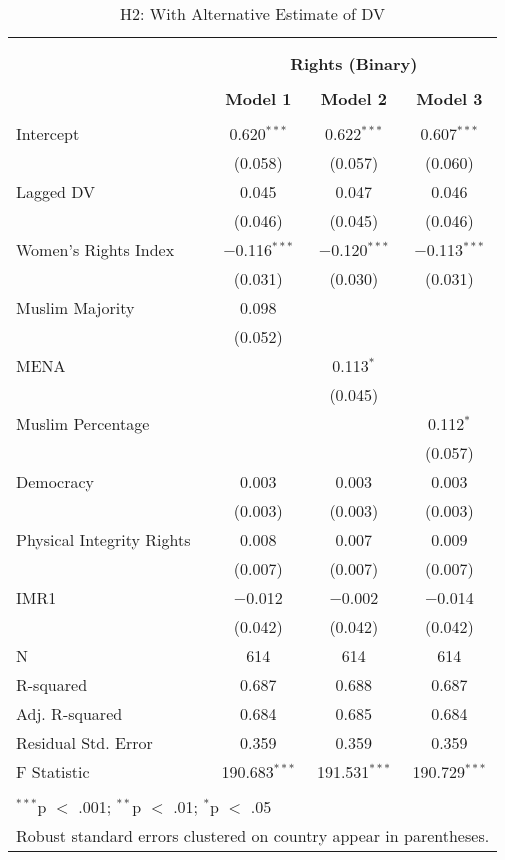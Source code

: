 
\begin{table}[!htbp] \centering 
  \caption{H2: With Alternative Estimate of DV} 
  \label{} 
\begin{tabular}{@{\extracolsep{5pt}}lccc} 
\\[-1.8ex]\hline \\[-1.8ex] 
\\[-1.8ex] & \multicolumn{3}{c}{\textbf{Rights (Binary)}} \\ 
\\[-1.8ex] & \textbf{Model 1} & \textbf{Model 2} & \textbf{Model 3}\\ 
\hline \\[-1.8ex] 
 Intercept & 0.620$^{***}$ & 0.622$^{***}$ & 0.607$^{***}$ \\ 
  & (0.058) & (0.057) & (0.060) \\ 
  Lagged DV & 0.045 & 0.047 & 0.046 \\ 
  & (0.046) & (0.045) & (0.046) \\ 
  Women's Rights Index & $-$0.116$^{***}$ & $-$0.120$^{***}$ & $-$0.113$^{***}$ \\ 
  & (0.031) & (0.030) & (0.031) \\ 
  Muslim Majority & 0.098 &  &  \\ 
  & (0.052) &  &  \\ 
  MENA &  & 0.113$^{*}$ &  \\ 
  &  & (0.045) &  \\ 
  Muslim Percentage &  &  & 0.112$^{*}$ \\ 
  &  &  & (0.057) \\ 
  Democracy & 0.003 & 0.003 & 0.003 \\ 
  & (0.003) & (0.003) & (0.003) \\ 
  Physical Integrity Rights & 0.008 & 0.007 & 0.009 \\ 
  & (0.007) & (0.007) & (0.007) \\ 
  IMR1 & $-$0.012 & $-$0.002 & $-$0.014 \\ 
  & (0.042) & (0.042) & (0.042) \\ 
 N & 614 & 614 & 614 \\ 
R-squared & 0.687 & 0.688 & 0.687 \\ 
Adj. R-squared & 0.684 & 0.685 & 0.684 \\ 
Residual Std. Error & 0.359 & 0.359 & 0.359 \\ 
F Statistic & 190.683$^{***}$ & 191.531$^{***}$ & 190.729$^{***}$ \\ 
\hline \\[-1.8ex] 
\multicolumn{4}{l}{$^{***}$p $<$ .001; $^{**}$p $<$ .01; $^{*}$p $<$ .05} \\ 
\multicolumn{4}{l}{Robust standard errors clustered on country appear in parentheses.} \\ 
\end{tabular} 
\end{table} 

